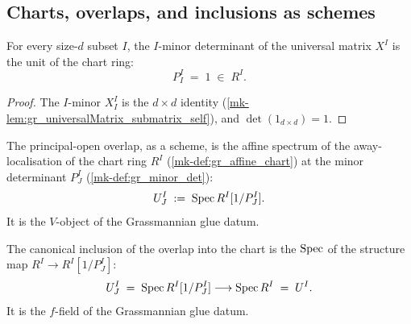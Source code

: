 \subsection*{Charts, overlaps, and inclusions as schemes}

\begin{theorem}\label{mk-lem:gr_minorDet_self}
  \leanok

  For every size-\(d\) subset \(I\), the \(I\)-minor determinant of the universal
  matrix \(X^I\) is the unit of the chart ring:
  \[
    P^I_I \;=\; 1 \;\in\; R^I.
  \]
\end{theorem}
\begin{proof}
  \leanok
  The \(I\)-minor \(X^I_I\) is the \(d \times d\) identity
  (\ref{mk-lem:gr_universalMatrix_submatrix_self}), and \(\det(1_{d\times d}) = 1\).

\end{proof}

\begin{definition}\label{mk-def:gr_chart_overlap}
  \leanok

  The principal-open overlap, as a scheme, is the affine spectrum of the
  away-localisation of the chart ring \(R^I\) (\ref{mk-def:gr_affine_chart}) at the
  minor determinant \(P^I_J\) (\ref{mk-def:gr_minor_det}):
  \[
    U^I_J \;:=\; \operatorname{Spec} R^I[1/P^I_J].
  \]
  It is the \(V\)-object of the Grassmannian glue datum.
\end{definition}

\begin{definition}\label{mk-def:gr_chart_incl}
  \leanok

  The canonical inclusion of the overlap into the chart is the \(\operatorname{Spec}\) of the
  structure map \(R^I \to R^I[1/P^I_J]\):
  \[
    U^I_J \;=\; \operatorname{Spec} R^I[1/P^I_J] \longrightarrow \operatorname{Spec} R^I \;=\; U^I .
  \]
  It is the \(f\)-field of the Grassmannian glue datum.
\end{definition}


